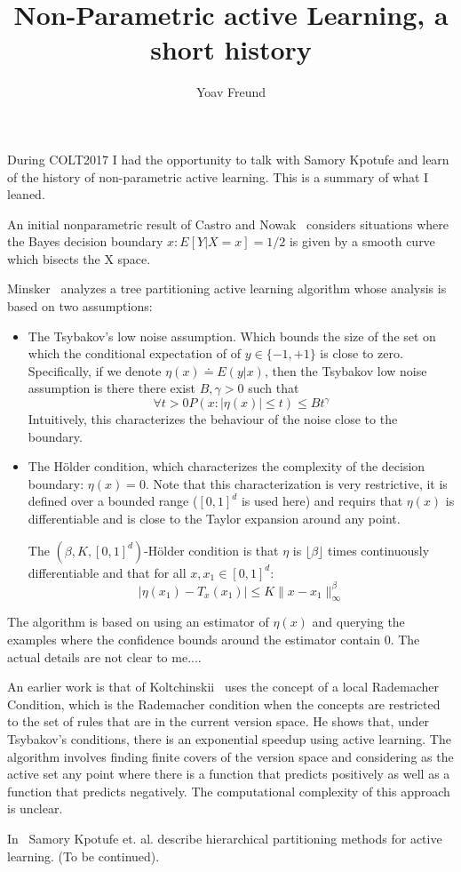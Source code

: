\documentclass{article}
\title{Non-Parametric active Learning, a short history}
\author{Yoav Freund}
\begin{document}
\maketitle

During COLT2017 I had the opportunity to talk with Samory Kpotufe and
learn of the history of non-parametric active learning. This is a
summary of what I leaned.

An initial nonparametric result of Castro and
Nowak~\cite{castro2008minimax} considers situations where the Bayes
decision boundary ${x : E[Y |X = x] = 1/2}$ is given by a smooth curve
which bisects the X space.

Minsker~\cite{minsker2012plug} analyzes a tree partitioning active
learning algorithm whose analysis is based on two assumptions:

\begin{itemize}
  \item The Tsybakov's low noise assumption. Which bounds the size of the set
    on which the conditional expectation of of $y \in \{-1,+1\}$ is close to
    zero. Specifically, if we denote $\eta(x) \doteq E(y|x)$, then the
    Tsybakov low noise assumption is there there exist $B,\gamma >0$ such
    that
    \[
    \forall t>0 P(x: |\eta(x)|\leq t) \leq B t^{\gamma}
    \]
    Intuitively, this characterizes the behaviour of the noise close
    to the boundary.
  \item
    The H{\"o}lder condition, which characterizes the
    complexity of the decision boundary: $\eta(x)=0$. Note that this
    characterization is very restrictive, it is defined over a bounded
    range  ($[0,1]^d$ is used here) and requirs that $\eta(x)$ is
    differentiable and is close to the Taylor expansion around any point.

    The $(\beta,K,[0,1]^d)$-H{\"o}lder condition is
    that $\eta$ is $\lfloor \beta \rfloor$ times continuously
    differentiable and that for all $x,x_1 \in [0,1]^d$:
    \[
    |\eta(x_1)-T_x(x_1)| \leq K \|x-x_1\|_{\infty}^{\beta}
    \]
\end{itemize}

The algorithm is based on using an estimator of $\eta(x)$ and querying
the examples where the confidence bounds around the estimator contain
$0$. The actual details are not clear to me....

An earlier work is that of
Koltchinskii~\cite{koltchinskii2010rademacher} uses the concept of a
local Rademacher Condition, which is the Rademacher condition when the
concepts are restricted to the set of rules that are in the current
version space. He shows that, under Tsybakov's conditions, there is an
exponential speedup using active learning. The algorithm involves
finding finite covers of the version space and considering as the
active set any point where there is a function that predicts
positively as well as a function that predicts negatively.
The computational complexity of this approach is unclear.

In~\cite{kpotufe2015hierarchical,andrea2017adaptivity} Samory Kpotufe
et. al. describe hierarchical partitioning methods for active learning.
(To be continued).

{}

\end{document}
